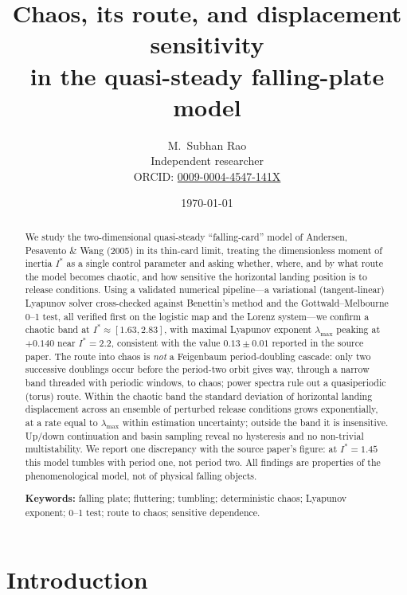 \documentclass[11pt]{article}
\title{\bfseries Chaos, its route, and displacement sensitivity\\
in the quasi-steady falling-plate model}
\author{M.\ Subhan Rao\\[2pt]
\small Independent researcher\\[1pt]
\small ORCID: \href{https://orcid.org/0009-0004-4547-141X}{0009-0004-4547-141X}}
\date{\today}
\newcommand{\Is}{I^{*}}          %
\newcommand{\lmax}{\lambda_{\max}}
\begin{document}
\maketitle

\begin{abstract}
\noindent
We study the two-dimensional quasi-steady ``falling-card'' model of Andersen, Pesavento \& Wang
(2005) in its thin-card limit, treating the dimensionless moment of inertia $\Is$ as a single control
parameter and asking whether, where, and by what route the model becomes chaotic, and how sensitive
the horizontal landing position is to release conditions. Using a validated numerical pipeline---a
variational (tangent-linear) Lyapunov solver cross-checked against Benettin's method and the
Gottwald--Melbourne 0--1 test, all verified first on the logistic map and the Lorenz system---we
confirm a chaotic band at $\Is \approx [1.63, 2.83]$, with maximal Lyapunov exponent $\lmax$ peaking
at $+0.140$ near $\Is=2.2$, consistent with the value $0.13\pm0.01$ reported in the source paper. The
route into chaos is \emph{not} a Feigenbaum period-doubling cascade: only two successive doublings
occur before the period-two orbit gives way, through a narrow band threaded with periodic windows, to
chaos; power spectra rule out a quasiperiodic (torus) route. Within the chaotic band the standard
deviation of horizontal landing displacement across an ensemble of perturbed release conditions grows
exponentially, at a rate equal to $\lmax$ within estimation uncertainty; outside the band it is
insensitive. Up/down continuation and basin sampling reveal no hysteresis and no non-trivial
multistability. We report one discrepancy with the source paper's figure: at $\Is=1.45$ this model
tumbles with period one, not period two. All findings are properties of the phenomenological model,
not of physical falling objects.

\medskip
\noindent\textbf{Keywords:} falling plate; fluttering; tumbling; deterministic chaos; Lyapunov
exponent; 0--1 test; route to chaos; sensitive dependence.
\end{abstract}

\section{Introduction}\label{sec:intro}
\end{document}
